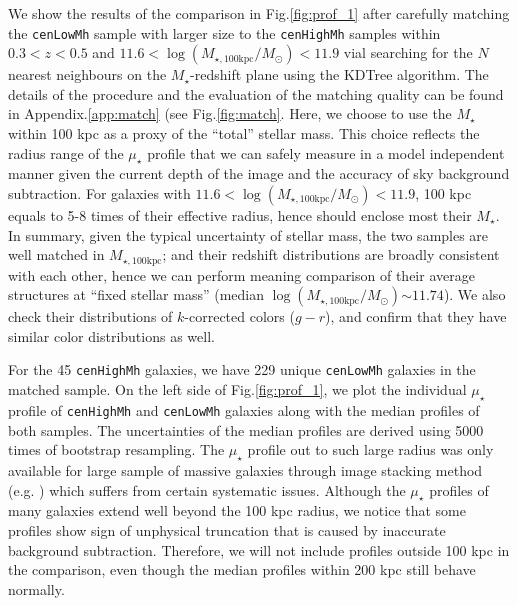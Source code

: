 \documentclass{emulateapj}
\def\rbcg{\texttt{cenHighMh}}
\def\nbcg{\texttt{cenLowMh}}
\def\mstar{{$M_{\star}$}}
\def\mtot{{$M_{\star,100\mathrm{kpc}}$}}
\def\logmtot{{$\log (M_{\star,100\mathrm{kpc}}/M_{\odot})$}}
\def\mden{{$\mu_{\star}$}}
\newcommand{\update}[1]{\textcolor{Bittersweet}{#1}}
\begin{document}
\begin{CJK*}{UTF8}{gbsn}
    \update{
    We show the results of the comparison in Fig.\ref{fig:prof_1} after 
    carefully matching the \nbcg{} sample with larger size to the \rbcg{} samples 
    within $0.3 < z < 0.5$ and $11.6 < $\logmtot{}$<11.9$ vial searching for the $N$ 
    nearest neighbours on the $M_{\star}$-redshift plane using the KDTree algorithm. 
    The details of the procedure and the evaluation of the matching quality can be 
    found in Appendix.\ref{app:match} (see Fig.\ref{fig:match}.
    Here, we choose to use the \mstar{} within 100 kpc as a proxy of the ``total''
    stellar mass.  
    This choice reflects the radius range of the \mden{} profile that we can safely 
    measure in a model independent manner given the current depth of the image and 
    the accuracy of sky background subtraction.
    For galaxies with $11.6 < $\logmtot{}$<11.9$, 100 kpc equals to 5-8 times of their 
    effective radius, hence should enclose most their \mstar{}.
    In summary, given the typical uncertainty of stellar mass, the two samples are well 
    matched in \mtot{}; and their redshift distributions are broadly consistent with 
    each other, hence we can perform meaning comparison of their average structures at 
    ``fixed stellar mass'' (median \logmtot{}$\sim 11.74$).    
    We also check their distributions of $k$-corrected colors ($g-r$), and confirm 
    that they have similar color distributions as well.
    }
    
    For the 45 \rbcg{} galaxies, we have 229 unique \nbcg{} galaxies in the 
    matched sample.
    \update{
    On the left side of Fig.\ref{fig:prof_1}, we plot the individual \mden{} profile 
    of \rbcg{} and \nbcg{} galaxies along with the median profiles of both samples.
    The uncertainties of the median profiles are derived using 5000 times of 
    bootstrap resampling.
    The \mden{} profile out to such large radius was only available for large sample of 
    massive galaxies through image stacking method (e.g. \citep{Tal2011, DSouza2015}) 
    which suffers from certain systematic issues.}
    Although the \mden{} profiles of many galaxies extend well beyond the 100 kpc radius, 
    we notice that some profiles show sign of unphysical truncation that is caused 
    by inaccurate background subtraction.  
    Therefore, we will not include profiles outside 100 kpc in the comparison, even 
    though the median profiles within 200 kpc still behave normally.  
        

\end{CJK*}
\end{document}
